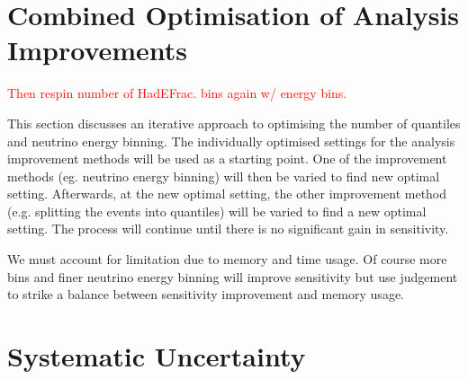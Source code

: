 \section{Combined Optimisation of Analysis Improvements}
\textcolor{red}{Then respin number of HadEFrac. bins again w/ energy
  bins. } 

This section discusses an iterative approach to optimising the number of
\hadefrac{} quantiles and neutrino energy binning. 
The individually optimised settings for the analysis improvement
methods will be used as a starting point.
One of the improvement methods (eg. neutrino energy binning) will
then be varied to find new optimal setting.
Afterwards, at the new optimal setting, the other improvement method
(e.g. splitting the events into \hadefrac{} quantiles) will be varied
to find a new optimal setting.
The process will continue until there is no significant gain in
sensitivity. 

We must account for limitation due to memory and time usage. Of course
more \hadefrac{} bins and finer neutrino energy binning will improve
sensitivity but use judgement to strike a balance between sensitivity
improvement and memory usage.


\section{Systematic Uncertainty}



